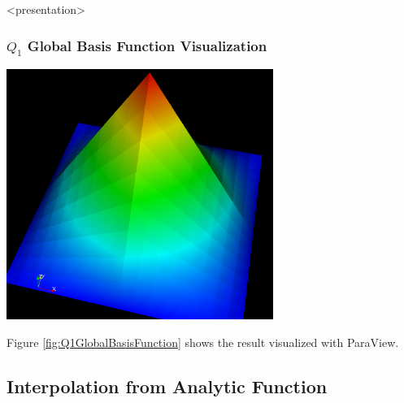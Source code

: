 \begin{frame}<presentation>
\frametitle<presentation>{$Q_1$ Global Basis Function Visualization}
\begin{center}
\includegraphics[width=0.65\textwidth]{./EPS/q1}
\end{center}
\end{frame}

Figure \ref{fig:Q1GlobalBasisFunction} shows the result visualized
with ParaView.


\subsection{Interpolation from Analytic Function}

